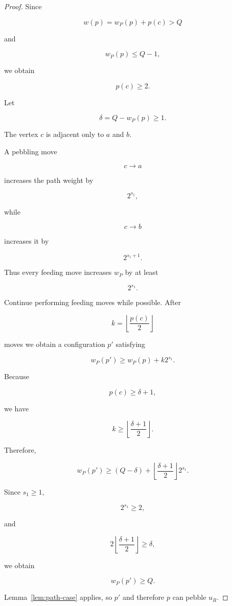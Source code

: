 \begin{proof}

Since

\[
w(p)=w_P(p)+p(c)>Q
\]

and

\[
w_P(p)\le Q-1,
\]

we obtain

\[
p(c)\ge2 .
\]


Let

\[
\delta=Q-w_P(p)\ge1 .
\]


The vertex $c$ is adjacent only to $a$ and $b$.

A pebbling move

\[
c\rightarrow a
\]

increases the path weight by

\[
2^{s_1},
\]

while

\[
c\rightarrow b
\]

increases it by

\[
2^{s_1+1}.
\]


Thus every feeding move increases $w_P$ by at least

\[
2^{s_1}.
\]


Continue performing feeding moves while possible. After

\[
k=\left\lfloor\frac{p(c)}2\right\rfloor
\]

moves we obtain a configuration $p'$ satisfying

\[
w_P(p')
\ge
w_P(p)+k2^{s_1}.
\]


Because

\[
p(c)\ge\delta+1,
\]

we have

\[
k\ge
\left\lfloor\frac{\delta+1}{2}\right\rfloor .
\]


Therefore,

\[
w_P(p')
\ge
(Q-\delta)
+
\left\lfloor\frac{\delta+1}{2}\right\rfloor2^{s_1}.
\]


Since $s_1\ge1$,

\[
2^{s_1}\ge2,
\]

and

\[
2\left\lfloor\frac{\delta+1}{2}\right\rfloor\ge\delta ,
\]

we obtain

\[
w_P(p')\ge Q .
\]


Lemma~\ref{lem:path-case} applies, so $p'$ and therefore $p$
can pebble $u_R$.

\end{proof}





